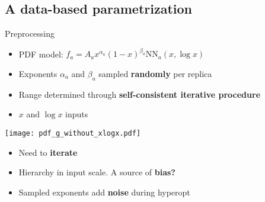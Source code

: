 \subsection{A data-based parametrization}

\begin{frame}[t]{Preprocessing}
  \begin{itemize}
    \item PDF model: $f_a=A_ax^{\alpha_a}(1-x)^{\beta_a} \mathrm{NN}_a(x,\log x)$
    \item Exponents $\alpha_a$ and $\beta_a$ sampled {\bf randomly} per replica
    \item Range determined through {\bf self-consistent iterative procedure}
    \item $x$ and $\log x$ inputs
  \end{itemize}

  \begin{center}
    \texttt{[image: pdf\_g\_without\_xlogx.pdf]}
  \end{center}

  \vspace*{-1cm}
  \begin{itemize}
    \item Need to {\bf iterate}
    \item Hierarchy in input scale. A source of {\bf bias?}
    \item Sampled exponents add {\bf noise} during hyperopt
  \end{itemize}
\end{frame}


